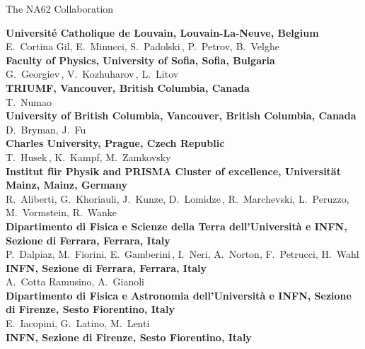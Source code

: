 \begin{center}
{\Large The NA62 Collaboration$\,$\renewcommand{\thefootnote}{\fnsymbol{footnote}}%
\footnotemark[1]\renewcommand{\thefootnote}{\arabic{footnote}}}\\
\end{center}
\vspace{3mm}
\begin{raggedright}
\noindent
{\bf Universit\'e Catholique de Louvain, Louvain-La-Neuve, Belgium}\\
 E.~Cortina Gil,
 E.~Minucci,
 S.~Padolski$\,$\footnotemark[1],
 P.~Petrov,
 B.~Velghe$\,$\footnotemark[2]\\[2mm]
{\bf Faculty of Physics, University of Sofia, Sofia, Bulgaria}\\
 G.~Georgiev$\,$\footnotemark[3],
 V.~Kozhuharov$\,$\footnotemark[3],
 L.~Litov\\[2mm]
{\bf TRIUMF, Vancouver, British Columbia, Canada}\\
 T.~Numao\\[2mm]
{\bf University of British Columbia, Vancouver, British Columbia, Canada}\\
 D.~Bryman,
 J.~Fu$\,$\footnotemark[4]\\[2mm]
{\bf Charles University, Prague, Czech Republic}\\
 T.~Husek$\,$\footnotemark[5],
 K.~Kampf,
 M.~Zamkovsky\\[2mm]
{\bf Institut f\"ur Physik and PRISMA Cluster of excellence, Universit\"at Mainz, Mainz, Germany}\\
 R.~Aliberti,
 G.~Khoriauli,
 J.~Kunze,
 D.~Lomidze$\,$\footnotemark[6],
 R.~Marchevski,
 L.~Peruzzo,
 M.~Vormstein,
 R.~Wanke\\[2mm]
{\bf Dipartimento di Fisica e Scienze della Terra dell'Universit\`a e INFN, Sezione di Ferrara, Ferrara, Italy}\\
 P.~Dalpiaz,
 M.~Fiorini,
 E.~Gamberini$\,$\footnotemark[7],
 I.~Neri,
 A.~Norton,
 F.~Petrucci,
 H.~Wahl\\[2mm]
{\bf INFN, Sezione di Ferrara, Ferrara, Italy}\\
 A.~Cotta Ramusino,
 A.~Gianoli\\[2mm]
{\bf Dipartimento di Fisica e Astronomia dell'Universit\`a e INFN, Sezione di Firenze, Sesto Fiorentino, Italy}\\
 E.~Iacopini,
 G.~Latino,
 M.~Lenti\\[2mm]
{\bf INFN, Sezione di Firenze, Sesto Fiorentino, Italy}\\

\end{raggedright}
